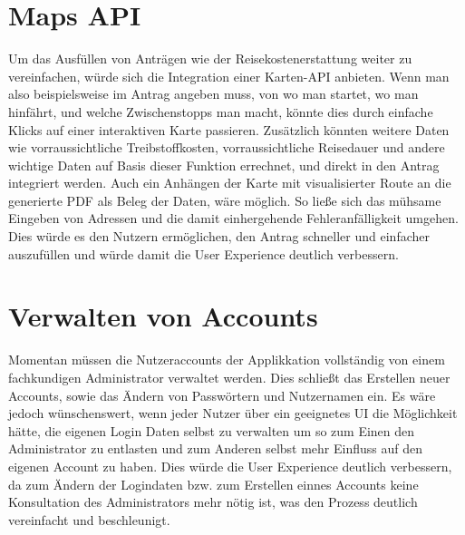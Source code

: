 \section{Maps \ac{API}}\label{sec: maps api}
Um das Ausfüllen von Anträgen wie der Reisekostenerstattung weiter zu vereinfachen, würde 
sich die Integration einer Karten-\ac{API} anbieten. Wenn man also beispielsweise im 
Antrag angeben muss, von wo man startet, wo man hinfährt, und welche Zwischenstopps man 
macht, könnte dies durch einfache Klicks auf einer interaktiven Karte passieren. Zusätzlich 
könnten weitere Daten wie vorraussichtliche Treibstoffkosten, vorraussichtliche Reisedauer 
und andere wichtige Daten auf Basis dieser Funktion errechnet, und direkt in den Antrag 
integriert werden. Auch ein Anhängen der Karte mit visualisierter Route an die generierte
PDF als Beleg der Daten, wäre möglich. So ließe sich das mühsame Eingeben von Adressen 
und die damit einhergehende Fehleranfälligkeit umgehen. Dies würde es den Nutzern 
ermöglichen, den Antrag schneller und einfacher auszufüllen und würde damit die User 
Experience deutlich verbessern.

\section{Verwalten von Accounts}\label{sec: verwalten von Accounts}
Momentan müssen die Nutzeraccounts der Applikkation vollständig von einem fachkundigen 
Administrator verwaltet werden. Dies schließt das Erstellen neuer Accounts, sowie das 
Ändern von Passwörtern und Nutzernamen ein. Es wäre jedoch wünschenswert, wenn jeder 
Nutzer über ein geeignetes \ac{UI} die Möglichkeit hätte, die eigenen Login Daten selbst 
zu verwalten um so zum Einen den Administrator zu entlasten und zum Anderen selbst mehr 
Einfluss auf den eigenen Account zu haben. Dies würde die User Experience deutlich 
verbessern, da zum Ändern der Logindaten bzw. zum Erstellen einnes Accounts keine 
Konsultation des Administrators mehr nötig ist, was den Prozess deutlich vereinfacht und 
beschleunigt.